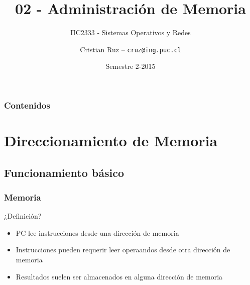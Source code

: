 \documentclass[letter]{beamer}
\title[IIC2333] %
{02 - Administración de Memoria}
\subtitle{IIC2333 - Sistemas Operativos y Redes}
\author[C.Ruz] %
{Cristian Ruz -- {\tt cruz@ing.puc.cl} }
\institute[PUC] %
{
  Departamento de Ciencia de la Computación\\
  Pontificia Universidad Católica de Chile
}
\date[2/2015] %
{Semestre 2-2015}
\begin{document}
\frame{\titlepage}

\begin{frame}
\frametitle{Contenidos}
\tableofcontents
\end{frame}


\section{Direccionamiento de Memoria}

\subsection{Funcionamiento básico}

\begin{frame}
  \frametitle{Memoria}

  ¿Definición? 
  
   
  
  \begin{itemize}
    \item <4-> PC lee instrucciones desde una dirección de memoria
    \item <4-> Instrucciones pueden requerir leer operaandos desde otra dirección de memoria
    \item <4-> Resultados suelen ser almacenados en alguna dirección de memoria
  \end{itemize}
  
  
    
  
\end{frame}
\end{document}
